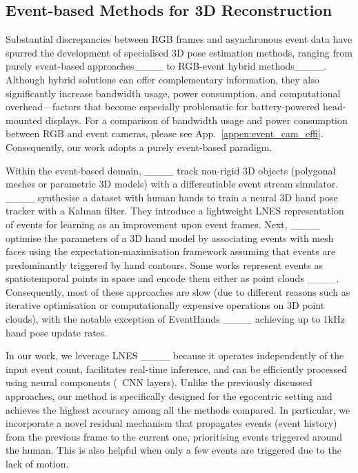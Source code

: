 \subsection{Event-based Methods for 3D Reconstruction} 

Substantial discrepancies between RGB frames and asynchronous event data have spurred the development of specialised 3D pose estimation methods, ranging from purely event-based approaches____ to RGB-event hybrid methods____. 
%
Although hybrid solutions can offer complementary information, they also significantly increase bandwidth usage, power consumption, and computational overhead---factors that become especially problematic for battery-powered head-mounted displays. For a comparison of bandwidth usage and power consumption between RGB and event cameras, please see App.~\ref{appen:event_cam_effi}. 
%
Consequently, our work adopts a purely event-based paradigm.


Within the event-based domain, ____ track non-rigid 3D objects (polygonal meshes or parametric 3D models) with 
a differentiable event stream simulator. 
____ synthesise a 
dataset with human hands 
to train a neural 3D hand pose tracker with a Kalman filter. 
They introduce a lightweight LNES representation of events for learning as an improvement upon event frames. 
Next, ____ optimise the parameters of a 3D hand model by associating events with mesh faces using the expectation-maximisation framework assuming that events are predominantly triggered by hand contours. 
Some works represent events as spatiotemporal points in space and encode them either as point clouds 
____. 
Consequently, most of these approaches are slow (due to different reasons such as iterative optimisation or computationally expensive operations on 3D point clouds), with the notable exception of EventHands ____ 
achieving up to $1$kHz hand pose update rates. 


In our work, we leverage LNES ____ because it operates independently of the input event count, facilitates real-time inference, and can be efficiently processed using neural components (\eg~CNN layers). 
%
Unlike the previously discussed approaches, our method is specifically designed for the egocentric setting and achieves the highest accuracy among all the methods compared.
%
In particular, we incorporate 
a novel residual %
mechanism that propagates events (event history) from the previous frame to the current one, prioritising events triggered around the human. 
This is also helpful 
when only a few events are triggered due to the lack of motion. 


